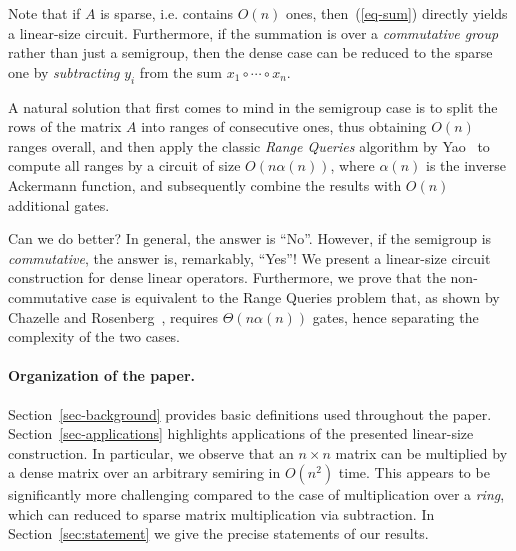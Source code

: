 \documentclass[11pt,letterpaper]{article}
\begin{document}
Note that if $A$ is sparse, i.e. contains $O(n)$ ones, then~(\ref{eq-sum})
directly yields a linear-size circuit. Furthermore, if the summation is over a
\emph{commutative group} rather than just a semigroup, then the dense case can
be reduced to the sparse one by \emph{subtracting} $y_i$ from the sum
$x_1 \circ \cdots \circ x_n$.

A natural solution that first comes to mind in the semigroup case is to split
the rows of the matrix $A$ into ranges of consecutive ones, thus obtaining
$O(n)$ ranges overall, and then apply the classic \emph{Range Queries} algorithm
by Yao~\cite{DBLP:conf/stoc/Yao82} to compute all ranges by a circuit of size
$O(n\alpha(n))$, where $\alpha(n)$ is the inverse Ackermann function, and
subsequently combine the results with $O(n)$ additional gates.

Can we do better? In general, the answer is ``No''. However, if the semigroup is
\emph{commutative}, the answer is, remarkably, ``Yes''! We present a linear-size
circuit construction for dense linear operators.
Furthermore, 
we prove that the
non-commutative case is equivalent to the Range Queries problem that, as shown
by Chazelle and Rosenberg~\cite{DBLP:journals/ijcga/ChazelleR91}, requires
$\Theta(n\alpha(n))$ gates, hence separating the complexity of the two cases. 







\paragraph{Organization of the paper.} Section~\ref{sec-background} provides basic definitions used throughout the
paper. Section~\ref{sec-applications} highlights applications of the
presented linear-size construction. In particular, we observe that an
$n\times n$ matrix can be multiplied by a dense matrix over an arbitrary
semiring in $O(n^2)$ time. This appears to be significantly more challenging
compared to the case of multiplication over a \emph{ring}, which can reduced to
sparse matrix multiplication via subtraction. In Section~\ref{sec:statement} we give the precise statements of our results.
\end{document}

